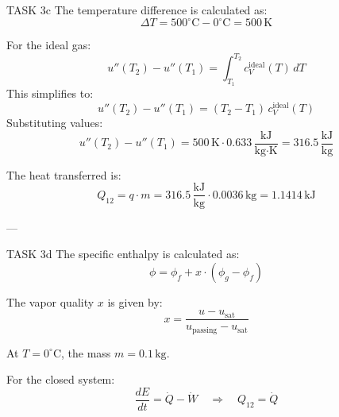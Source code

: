 TASK 3c  
The temperature difference is calculated as:  
\[
\Delta T = 500^\circ\text{C} - 0^\circ\text{C} = 500 \, \text{K}
\]  

For the ideal gas:  
\[
u''(T_2) - u''(T_1) = \int_{T_1}^{T_2} c_V^{\text{ideal}}(T) \, dT
\]  
This simplifies to:  
\[
u''(T_2) - u''(T_1) = (T_2 - T_1) \, c_V^{\text{ideal}}(T)
\]  
Substituting values:  
\[
u''(T_2) - u''(T_1) = 500 \, \text{K} \cdot 0.633 \, \frac{\text{kJ}}{\text{kg·K}} = 316.5 \, \frac{\text{kJ}}{\text{kg}}
\]  

The heat transferred is:  
\[
Q_{12} = q \cdot m = 316.5 \, \frac{\text{kJ}}{\text{kg}} \cdot 0.0036 \, \text{kg} = 1.1414 \, \text{kJ}
\]  

---

TASK 3d  
The specific enthalpy is calculated as:  
\[
\phi = \phi_f + x \cdot (\phi_g - \phi_f)
\]  

The vapor quality \( x \) is given by:  
\[
x = \frac{u - u_{\text{sat}}}{u_{\text{passing}} - u_{\text{sat}}}
\]  

At \( T = 0^\circ\text{C} \), the mass \( m = 0.1 \, \text{kg} \).  

For the closed system:  
\[
\frac{dE}{dt} = \dot{Q} - \dot{W} \quad \Rightarrow \quad Q_{12} = \dot{Q}
\]  